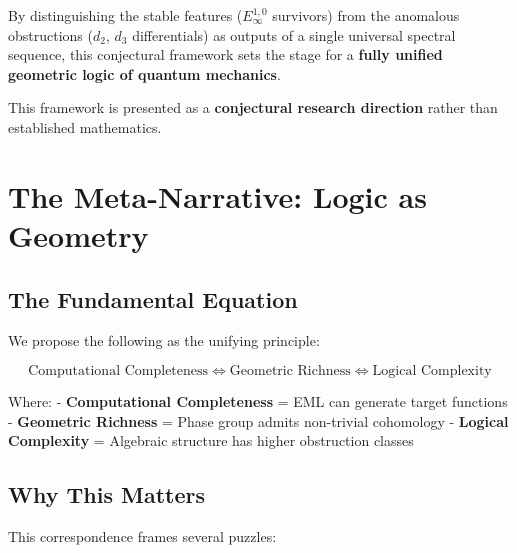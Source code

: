 \documentclass[11pt]{article}
\begin{document}
By distinguishing the stable features ($E_\infty^{1,0}$ survivors) from the anomalous obstructions ($d_2$, $d_3$ differentials) as outputs of a single universal spectral sequence, this conjectural framework sets the stage for a \textbf{fully unified geometric logic of quantum mechanics}.

This framework is presented as a \textbf{conjectural research direction} rather than established mathematics.



\section{The Meta-Narrative: Logic as Geometry}
\label{the-meta-narrative-logic-as-geometry}

\subsection{The Fundamental Equation}
\label{the-fundamental-equation}

We propose the following as the unifying principle:

\[\boxed{\text{Computational Completeness} \iff \text{Geometric Richness} \iff \text{Logical Complexity}}\]

Where: - \textbf{Computational Completeness} = EML can generate target functions - \textbf{Geometric Richness} = Phase group admits non-trivial cohomology - \textbf{Logical Complexity} = Algebraic structure has higher obstruction classes

\subsection{Why This Matters}
\label{why-this-matters}

This correspondence frames several puzzles:
\end{document}

